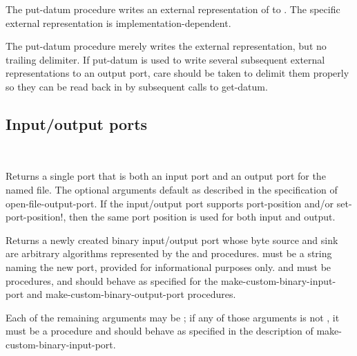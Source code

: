 \begin{entry}{%
}

The {\cf put-datum} procedure writes an external representation of
 to .
The specific external representation is implementation-dependent.

\begin{note}
  The {\cf put-datum} procedure merely writes the external
  representation, but no trailing delimiter.  If {\cf put-datum} is
  used to write several subsequent external representations to an
  output port, care should be taken to delimit them properly so they can
  be read back in by subsequent calls to {\cf get-datum}.
\end{note}
\end{entry}


\subsection{Input/output ports}

\begin{entry}{%
\\
}
   
Returns a single port that is both an input port and an
output port for the named file.
The optional arguments default as described in the specification
of {\cf open-file-output-port}.
If the input/output port supports {\cf port-position} and/or
{\cf set-port-position!}, then the same port position is used
for both input and output.
\end{entry}

\begin{entry}{%
}

Returns a newly created binary input/output port whose
byte source and sink are
arbitrary algorithms represented by the  and 
procedures.
 must be a string naming the new port,
provided for informational purposes only.
 and  must be procedures,
and should behave as specified for the
{\cf make-custom-binary-input-port} and
{\cf make-custom-binary-output-port} procedures.

Each of the remaining arguments may be \schfalse{}; if any of
those arguments is not \schfalse{}, it must be a procedure and
should behave as specified in the description of
{\cf make-custom-binary-input-port}.
\end{entry}


